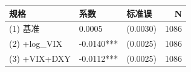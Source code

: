 \caption{PSA — 加入宏观控制变量稳健性检验（7D_EWMA_Intraday_Price_Volatility）}
\begin{tabular}{lllr}
\toprule
规格 & 系数 & 标准误 & N \\
\midrule
(1) 基准 & 0.0005 & (0.0030) & 1086 \\
(2) +log_VIX & -0.0140*** & (0.0025) & 1086 \\
(3) +VIX+DXY & -0.0112*** & (0.0025) & 1086 \\
\bottomrule
\end{tabular}
